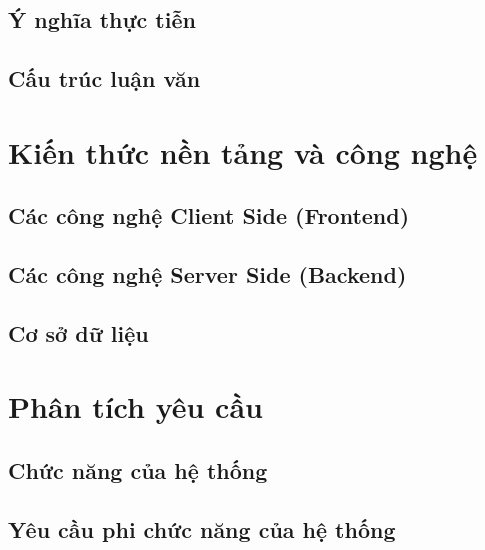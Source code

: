 \documentclass[a4paper]{article}
\begin{document}
\subsection{Ý nghĩa thực tiễn}


\subsection{Cấu trúc luận văn}





\newpage
\section{Kiến thức nền tảng và công nghệ}


\subsection{Các công nghệ Client Side (Frontend)}


\subsection{Các công nghệ Server Side (Backend)}


\subsection{Cơ sở dữ liệu}




\newpage
\section{Phân tích yêu cầu}

\subsection{Chức năng của hệ thống}


\subsection{Yêu cầu phi chức năng của hệ thống}

\end{document}
